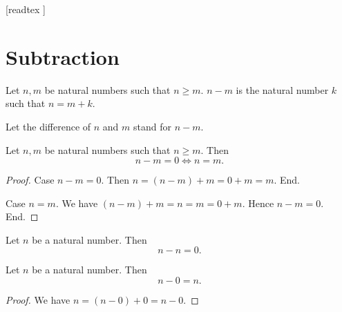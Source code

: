 \documentclass[10pt]{article}
\begin{document}
  \begin{imports}
    \begin{forthel}

      [readtex ]

    \end{forthel}
  \end{imports}


  \section{Subtraction}

  \begin{forthel}
    \begin{definition}
      Let $n, m$ be natural numbers such that $n \geq m$.
      $n - m$ is the natural number $k$ such that $n = m + k$.
    \end{definition}

    Let the difference of $n$ and $m$ stand for $n - m$.
  \end{forthel}

  \begin{forthel}
    \begin{proposition}
      Let $n, m$ be natural numbers such that $n \geq m$.
      Then \[ n - m = 0 \iff n = m. \]
    \end{proposition}
    \begin{proof}
      Case $n - m = 0$.
        Then $n
          = (n - m) + m
          = 0 + m
          = m$.
      End.

      Case $n = m$.
        We have $(n - m) + m
          = n
          = m
          = 0 + m$.
        Hence $n - m = 0$.
      End.
    \end{proof}
  \end{forthel}

  \begin{forthel}
    \begin{corollary}
      Let $n$ be a natural number.
      Then \[ n - n = 0. \]
    \end{corollary}
  \end{forthel}

  \begin{forthel}
    \begin{proposition}
      Let $n$ be a natural number.
      Then \[ n - 0 = n. \]
    \end{proposition}
    \begin{proof}
      We have $n
        = (n - 0) + 0
        = n - 0$.
    \end{proof}
  \end{forthel}
\end{document}
